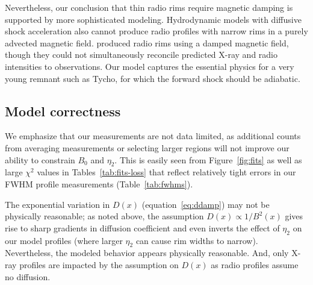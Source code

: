\documentclass[iop, apj, numberedappendix]{emulateapj}
\newcommand*{\mt}{\mathrm}
\newcommand*{\Ecut}{E_{\mt{cut}}}
\newcommand*{\Bmin}{B_{\mt{min}}}
\begin{document}
Nevertheless, our conclusion that thin radio rims require magnetic damping is
supported by more sophisticated modeling.  Hydrodynamic models with diffusive
shock acceleration \citep{cassam-chenai2007, slane2014} also cannot produce
radio profiles with narrow rims in a purely advected magnetic field.
\citet{cassam-chenai2007} produced radio rims using a damped magnetic field,
though they could not simultaneously reconcile predicted X-ray and radio
intensities to observations.  Our model captures the essential physics for a
very young remnant such as Tycho, for which the forward shock should be
adiabatic.


\subsection{Model correctness}

We emphasize that our measurements are not data limited, as additional counts
from averaging measurements or selecting larger regions will not improve our
ability to constrain $B_0$ and $\eta_2$.  This is easily seen from
Figure~\ref{fig:fits} as well as large $\chi^2$ values in
Tables~\ref{tab:fits-loss} that reflect relatively tight errors in our FWHM
profile measurements (Table~\ref{tab:fwhms}).

The exponential variation in $D(x)$ (equation~\eqref{eq:ddamp}) may not be
physically reasonable; as noted above, the assumption $D(x)
\propto 1 / B^2(x)$ gives rise to sharp gradients in diffusion coefficient and
even inverts the effect of $\eta_2$ on our model profiles (where larger
$\eta_2$ can cause rim widths to narrow).  Nevertheless, the modeled behavior
appears physically reasonable.  And, only X-ray profiles are impacted by the
assumption on $D(x)$ as radio profiles assume no diffusion.


\end{document}
